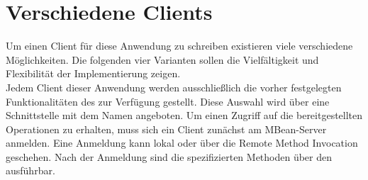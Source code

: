 \section{Verschiedene Clients}
Um einen Client f\"ur diese Anwendung zu schreiben existieren viele verschiedene M\"oglichkeiten. Die folgenden vier Varianten sollen die Vielfältigkeit und Flexibilität der Implementierung zeigen.\\
Jedem Client dieser Anwendung werden ausschlie\ss lich die vorher festgelegten Funktionalit\"aten des  zur Verf\"ugung gestellt. Diese Auswahl wird \"uber eine Schnittstelle mit dem Namen  angeboten. Um einen Zugriff auf die bereitgestellten Operationen zu erhalten, muss sich ein Client zun\"achst am MBean-Server anmelden. Eine Anmeldung kann lokal oder \"uber die Remote Method Invocation geschehen. Nach der Anmeldung sind die spezifizierten Methoden \"uber den  ausf\"uhrbar.

